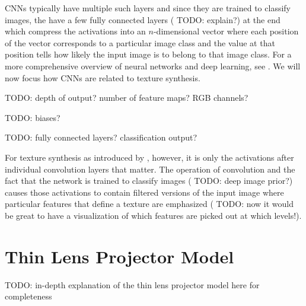 CNNs typically have multiple such layers and since they are trained to classify images, the have a few fully connected layers ({\color{red} TODO:  explain?}) at the end which compress the activations into an \(n\)-dimensional vector where each position of the vector corresponds to a particular image class and the value at that position tells how likely the input image is to belong to that image class. For a more comprehensive overview of neural networks and deep learning, see \citet{Goodfellow2016}. We will now focus how CNNs are related to texture synthesis.

{\color{red} TODO: depth of output? number of feature maps? RGB channels?}

{\color{red} TODO: biases?}

{\color{red} TODO: fully connected layers? classification output?}

For texture synthesis as introduced by \citet{Gatys2015}, however, it is only the activations after individual convolution layers that matter. The operation of convolution and the fact that the network is trained to classify images ({\color{red} TODO: deep image prior?}) causes those activations to contain filtered versions of the input image where particular features that define a texture are emphasized ({\color{red} TODO: now it would be great to have a visualization of which features are picked out at which levels!}).

\chapter{Thin Lens Projector Model}
\label{chapter:appendix-projector}

{\color{red} TODO: in-depth explanation of the thin lens projector model here for completeness}
